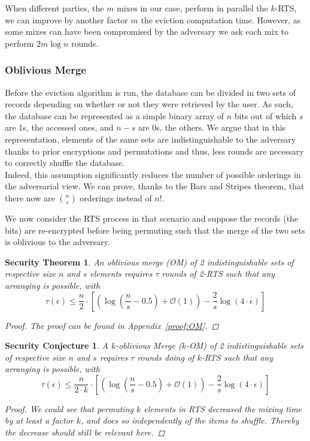 \documentclass{llncs}
\newtheorem{secthm}{Security Theorem}
\newtheorem{seccjt}{Security Conjecture}
\begin{document}
When different parties, the $m$ mixes in our case, perform in parallel the $k$-RTS, we can improve by another factor $m$ the eviction computation time. However, as some mixes can have been compromised by the adversary we ask each mix to perform $2 m\log n$ rounds.
%
\subsubsection{Oblivious Merge}\label{OM}
Before the eviction algorithm is run, the database can be divided in two sets of records depending on whether or not they were retrieved by the user. As such, the database can be represented as a simple binary array of $n$ bits out of which $s$ are 1s, the accessed ones, and $n-s$ are 0s, the others.
We argue that in this representation, elements of the same sets are indistinguishable to the adversary thanks to prior encryptions and permutations and thus, less rounds are necessary to correctly shuffle the database.\\

Indeed, this assumption significantly reduces the number of possible orderings in the adversarial view. We can prove, thanks to the Bars and Stripes theorem, that there now are ${n \choose s}$ orderings instead of $n!$.

We now consider the RTS process in that scenario and suppose the records (the bits) are re-encrypted before being permuting such that the merge of the two sets is oblivious to the adversary.

\begin{secthm}
An oblivious merge (OM) of 2 indistinguishable sets of respective size $n$ and $s$ elements requires $\tau$ rounds of 2-RTS such that any arranging is possible, with
$$\tau(\epsilon) \leq \frac{n}{2}  \cdot \left [ \left( \log \left (\frac{n}{s}-0.5\right) +\mathcal{O}\left(1\right) \right ) - \frac{2}{s} \log \left( 4 \cdot \epsilon\right) \right ] $$%
\begin{proof}
The proof can be found in Appendix~\ref{proof:OM}.
\end{proof}
\end{secthm}

\begin{seccjt}\label{sec:kOM}
A $k$-oblivious Merge ($k$-OM) of 2 indistinguishable sets of respective size $n$ and $s$ requires $\tau$ rounds doing of $k$-RTS such that any arranging is possible, with
$$ \tau(\epsilon) \leq \frac{n}{2\cdot k}  \cdot \left [ \left( \log \left (\frac{n}{s}-0.5\right) +\mathcal{O}\left(1\right) \right ) - \frac{2}{s} \log \left( 4 \cdot \epsilon\right) \right ] $$
\begin{proof}
We could see that permuting $k$ elements in RTS decreased the mixing time by at least a factor $k$, and does so independently of the items to shuffle. Thereby the decrease should still be relevant here.
\end{proof}
\end{seccjt}
%
\end{document}
